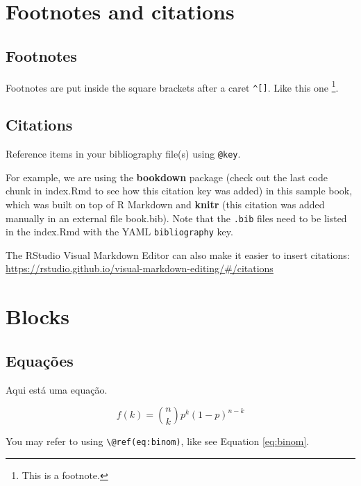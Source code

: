 \documentclass[
]{book}
\begin{document}
\hypertarget{footnotes-and-citations}{%
\chapter{Footnotes and citations}\label{footnotes-and-citations}}

\hypertarget{footnotes}{%
\section{Footnotes}\label{footnotes}}

Footnotes are put inside the square brackets after a caret \texttt{\^{}{[}{]}}. Like this one \footnote{This is a footnote.}.

\hypertarget{citations}{%
\section{Citations}\label{citations}}

Reference items in your bibliography file(s) using \texttt{@key}.

For example, we are using the \textbf{bookdown} package \citep{R-bookdown} (check out the last code chunk in index.Rmd to see how this citation key was added) in this sample book, which was built on top of R Markdown and \textbf{knitr} \citep{xie2015} (this citation was added manually in an external file book.bib).
Note that the \texttt{.bib} files need to be listed in the index.Rmd with the YAML \texttt{bibliography} key.

The RStudio Visual Markdown Editor can also make it easier to insert citations: \url{https://rstudio.github.io/visual-markdown-editing/\#/citations}

\hypertarget{blocks}{%
\chapter{Blocks}\label{blocks}}

\hypertarget{equauxe7uxf5es}{%
\section{Equações}\label{equauxe7uxf5es}}

Aqui está uma equação.

\begin{equation} 
  f\left(k\right) = \binom{n}{k} p^k\left(1-p\right)^{n-k}
  \label{eq:binom}
\end{equation}

You may refer to using \texttt{\textbackslash{}@ref(eq:binom)}, like see Equation \eqref{eq:binom}.
\end{document}
